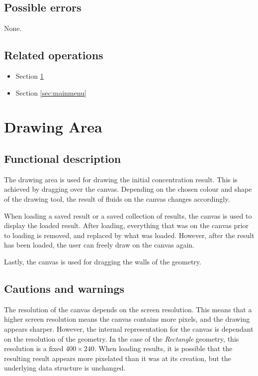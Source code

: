   \subsection*{Possible errors}
  None.

  \subsection*{Related operations}
  \begin{itemize}
    \item Section \ref{sec:drawingarea}
    \item Section \ref{sec:mainmenu}
  \end{itemize}

\section{Drawing Area}
\label{sec:drawingarea}
  \subsection*{Functional description}
  The drawing area is used for drawing the initial concentration result. This is achieved by dragging over the canvas. Depending on the chosen colour and shape of the drawing tool, the result of fluids on the canvas changes accordingly.
  
  When loading a saved result or a saved collection of results, the canvas is used to display the loaded result. After loading, everything that was on the canvas prior to loading is removed, and replaced by what was loaded. However, after the result has been loaded, the user can freely draw on the canvas again.
  
  Lastly, the canvas is used for dragging the walls of the geometry.
  
  \subsection*{Cautions and warnings}
  The resolution of the canvas depends on the screen resolution. This means that a higher screen resolution means the canvas contains more pixels, and the drawing appears sharper. However, the internal representation for the canvas is dependant on the resolution of the geometry. In the case of the \emph{Rectangle} geometry, this resolution is a fixed $400 \times 240$. When loading results, it is possible that the resulting result appears more pixelated than it was at its creation, but the underlying data structure is unchanged.
  
